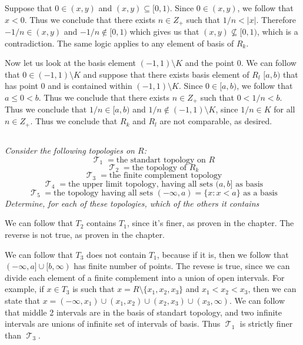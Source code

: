 \documentclass[11pt,oneside,titlepage]{book}
\DeclareMathOperator \topol {\mathcal {T}}
\newcommand{\set}[1]{\{ #1 \}}
\begin{document}
Suppose that $0 \in (x, y)$ and $(x, y) \subseteq [0, 1)$. Since $0 \in (x, y) $,
we follow that $x < 0$. Thus we conclude that there exists $n \in Z_+$ such that
$1/n < |x|$. Therefore $-1/n \in (x, y)$ and $-1/n \notin [0, 1)$ which gives us
that $(x, y) \not \subseteq [0, 1)$, which is a contradiction.
The same logic applies to any element of basis of $R_k$.

Now let us look at the basis element $(-1, 1) \setminus K$ and the point $0$. We can
follow that $0 \in (-1, 1) \setminus K$ and suppose that there exists basis element of
$R_l$  $[a, b)$ that has point $0$ and is contained within $(-1, 1) \setminus K$.
Since $0 \in [a, b)$, we follow that $a \leq 0 < b$. Thus we conclude that there exists
$n \in Z_+$ such that $0 < 1/n < b$. Thus we conclude that $1/n \in [a, b)$ and
$1/n \notin (-1, 1) \setminus K$, since $1/n \in K$ for all $n \in Z_+$. Thus we
conclude that $R_k$ and $R_l$ are not comparable, as desired.

\subsection{}

\textit{Consider the following topologies on $R$:
  $$\topol_1 = \text{the standart topology on $R$}$$
  $$\topol_2 = \text{the topology of $R_k$}$$
  $$\topol_3 = \text{the finite complement topology}$$
  $$\topol_4 = \text{the upper limit topology, having all sets $(a, b]$ as basis}$$
  $$\topol_5 = \text{the topology having all sets
    $(-\infty, a) = \set{x: x < a}$ as a basis}$$
    Determine, for each of these topologies, which of the others it contains
}

We can follow that $T_2$ contains $T_1$, since it's finer, as proven in the chapter. The
reverse is not true, as proven in the chapter.

We can follow that $T_3$ does not contain $T_1$, because if it is, then we follow that
$(-\infty, a] \cup [b, \infty)$ has finite number of points. The revese is true, since
we can divide each element of a finite complement into a union of
open intervals. For example, if $x \in T_3$ is such that $x = R \setminus \set{x_1, x_2, x_3}$
and $x_1 < x_2 < x_3$,
then we can state that $x = (-\infty, x_1) \cup (x_1, x_2) \cup (x_2, x_3) \cup (x_3, \infty)$.
We can follow that middle 2 intervals are in the basis of standart topology, and two infinite
intervals are unions of infinite set of intervals of basis.
Thus $\topol_1$ is strictly finer than $\topol_3$.
\end{document}
